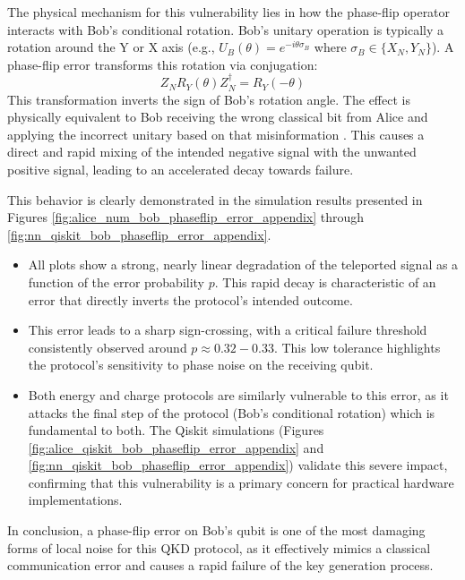 The physical mechanism for this vulnerability lies in how the phase-flip operator interacts with Bob's conditional rotation. Bob's unitary operation is typically a rotation around the Y or X axis (e.g., $U_B(\theta) = e^{-i\theta\sigma_B}$ where $\sigma_B \in \{X_N, Y_N\}$). A phase-flip error transforms this rotation via conjugation:
\begin{equation*}
Z_N R_Y(\theta) Z_N^\dagger = R_Y(-\theta)
\end{equation*}
This transformation inverts the sign of Bob's rotation angle. The effect is physically equivalent to Bob receiving the wrong classical bit from Alice and applying the incorrect unitary based on that misinformation \cite{QKDbyQET}. This causes a direct and rapid mixing of the intended negative signal with the unwanted positive signal, leading to an accelerated decay towards failure.

This behavior is clearly demonstrated in the simulation results presented in Figures \ref{fig:alice_num_bob_phaseflip_error_appendix} through \ref{fig:nn_qiskit_bob_phaseflip_error_appendix}.
\begin{itemize}
    \item All plots show a strong, nearly linear degradation of the teleported signal as a function of the error probability $p$. This rapid decay is characteristic of an error that directly inverts the protocol's intended outcome.
    
    \item This error leads to a sharp sign-crossing, with a critical failure threshold consistently observed around $p \approx 0.32-0.33$. This low tolerance highlights the protocol's sensitivity to phase noise on the receiving qubit.
    
    \item Both energy and charge protocols are similarly vulnerable to this error, as it attacks the final step of the protocol (Bob's conditional rotation) which is fundamental to both. The Qiskit simulations (Figures \ref{fig:alice_qiskit_bob_phaseflip_error_appendix} and \ref{fig:nn_qiskit_bob_phaseflip_error_appendix}) validate this severe impact, confirming that this vulnerability is a primary concern for practical hardware implementations.
\end{itemize}
In conclusion, a phase-flip error on Bob's qubit is one of the most damaging forms of local noise for this QKD protocol, as it effectively mimics a classical communication error and causes a rapid failure of the key generation process.

